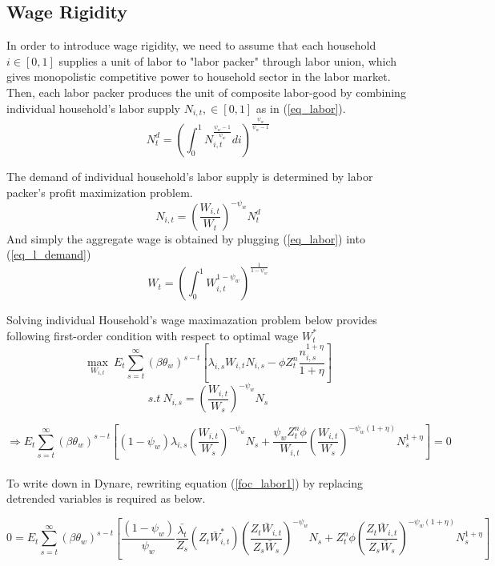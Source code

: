 \documentclass[11pt, a4paper]{article}
\begin{document}
\subsection{Wage Rigidity}
In order to introduce wage rigidity, we need to assume that each household $i \in [0, 1]$ supplies a unit of labor to "labor packer" through labor union, which gives monopolistic competitive power to household sector in the labor market. Then, each labor packer produces the unit of composite labor-good by combining individual household's labor supply $N_{i,t}, \in [0,1]$ as in (\ref{eq_labor}).
\begin{equation}N_t^d = \left( \int_0^1 N_{i,t}^{\frac{\psi_w -1}{\psi_w}}   di\right)^{\frac{\psi_w}{\psi_w -1}} \label{eq_labor}\end{equation} 
 
 The demand of individual household's labor supply is determined by labor packer's profit maximization problem. \\
\begin{equation}N_{i,t} = \left( \frac{W_{i,t}} {W_t}\right)^{-\psi_w} N_t^d  \label{eq_l_demand}\end{equation}
And simply the aggregate wage is obtained by plugging (\ref{eq_labor}) into (\ref{eq_l_demand})  
\[W_t = \left( \int_0^1 W_{i,t}^{1-\psi_w} \right)^{\frac{1}{1-\psi_w}} \]

Solving individual Household's wage maximazation problem below provides following first-order condition with respect to optimal wage $W_t^*$
\[\max_{{W_{i,t}}}~E_t \sum_{s=t}^{\infty} (\beta \theta_w)^{s-t}\left[\lambda_{i,s} W_{i,t} N_{i,s} - \phi {Z_t^n}\frac{n_{i,s}^{1+\eta}}{1+\eta} \right] \]
\[s.t~ N_{i,s} = \left( \frac{W_{i,t}} {W_s}\right)^{-\psi_w} N_s \] 


\begin{equation} \Rightarrow E_t \sum_{s=t}^{\infty} (\beta \theta_w)^{s-t}\left[(1-\psi_w) \lambda_{i,s} \left(\frac{W_{i,t}}{W_{s}} \right)^{-\psi_w} N_s + \frac{\psi_w {Z_t^n}\phi}{W_{i,t}} \left( \frac{W_{i,t}}{W_s} \right)^{-\psi_w (1+\eta)}N_s^{1+\eta}\right]=0 \label{foc_labor1}\end{equation} \\


To write down in Dynare, rewriting equation (\ref{foc_labor1}) by replacing detrended variables is required as below.

\[0 = E_t \sum_{s=t}^{\infty} (\beta \theta_w)^{s-t}\left[\frac{(1-\psi_w)}{\psi_w}\frac{\bar{\lambda_t}} {Z_s }({Z_t \bar{W}_{i,t}^*}) \left(\frac{Z_t \bar{W}_{i,t}}{Z_s \bar{W}_{s}} \right)^{-\psi_w} N_s + {{Z_t^n}\phi} \left(\frac{Z_t \bar{W}_{i,t}}{Z_s \bar{W}_{s}} \right)^{-\psi_w (1+\eta)}N_s^{1+\eta}\right] \]
\end{document}
